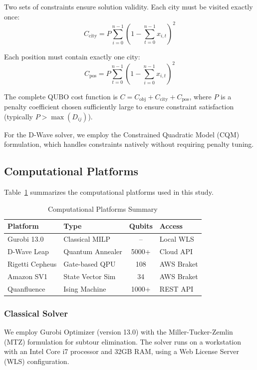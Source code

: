 \documentclass[conference]{IEEEtran}
\begin{document}
Two sets of constraints ensure solution validity. Each city must be visited exactly once:
\begin{equation}
C_{\text{city}} = P \sum_{i=0}^{n-1} \left(1 - \sum_{t=0}^{n-1} x_{i,t}\right)^2
\label{eq:city_constraint}
\end{equation}

Each position must contain exactly one city:
\begin{equation}
C_{\text{pos}} = P \sum_{t=0}^{n-1} \left(1 - \sum_{i=0}^{n-1} x_{i,t}\right)^2
\label{eq:pos_constraint}
\end{equation}

The complete QUBO cost function is $C = C_{\text{obj}} + C_{\text{city}} + C_{\text{pos}}$, where $P$ is a penalty coefficient chosen sufficiently large to ensure constraint satisfaction (typically $P > \max(D_{ij})$).

For the D-Wave solver, we employ the Constrained Quadratic Model (CQM) formulation, which handles constraints natively without requiring penalty tuning.

\subsection{Computational Platforms}

Table~\ref{tab:platforms} summarizes the computational platforms used in this study.

\begin{table}[htbp]
\caption{Computational Platforms Summary}
\begin{center}
\begin{tabular}{|l|l|c|l|}
\hline
\textbf{Platform} & \textbf{Type} & \textbf{Qubits} & \textbf{Access} \\
\hline
Gurobi 13.0 & Classical MILP & -- & Local WLS \\
\hline
D-Wave Leap & Quantum Annealer & 5000+ & Cloud API \\
\hline
Rigetti Cepheus & Gate-based QPU & 108 & AWS Braket \\
\hline
Amazon SV1 & State Vector Sim & 34 & AWS Braket \\
\hline
Quanfluence & Ising Machine & 1000+ & REST API \\
\hline
\end{tabular}
\label{tab:platforms}
\end{center}
\end{table}

\subsubsection{Classical Solver}
We employ Gurobi Optimizer (version 13.0) with the Miller-Tucker-Zemlin (MTZ) formulation for subtour elimination. The solver runs on a workstation with an Intel Core i7 processor and 32GB RAM, using a Web License Server (WLS) configuration.
\end{document}
